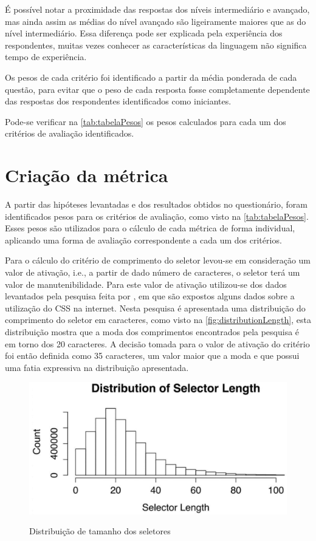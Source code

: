 É possível notar a proximidade das respostas dos níveis intermediário e avançado, mas ainda assim as médias do nível avançado são ligeiramente maiores que as do nível intermediário. Essa diferença pode ser explicada pela experiência dos respondentes, muitas vezes conhecer as características da linguagem não significa tempo de experiência.

Os pesos de cada critério foi identificado a partir da média ponderada de cada questão, para evitar que o peso de cada resposta fosse completamente dependente das respostas dos respondentes identificados como iniciantes.

Pode-se verificar na \autoref{tab:tabelaPesos} os pesos calculados para cada um dos critérios de avaliação identificados.



\section{Criação da métrica}
	
A partir das hipóteses levantadas e dos resultados obtidos no questionário, foram identificados pesos para os critérios de avaliação, como visto na \autoref{tab:tabelaPesos}. Esses pesos são utilizados para o cálculo de cada métrica de forma individual, aplicando uma forma de avaliação correspondente a cada um dos critérios.

Para o cálculo do critério de comprimento do seletor levou-se em consideração um valor de ativação, i.e., a partir de dado número de caracteres, o seletor terá um valor de manutenibilidade. Para este valor de ativação utilizou-se dos dados levantados pela pesquisa feita por , em que são expostos alguns dados sobre a utilização do CSS na internet. Nesta pesquisa é apresentada uma distribuição do comprimento do seletor em caracteres, como visto na \autoref{fig:distributionLength}, esta distribuição mostra que a moda dos comprimentos encontrados pela pesquisa é em torno dos 20 caracteres. A decisão tomada para o valor de ativação do critério foi então definida como 35 caracteres, um valor maior que a moda e que possui uma fatia expressiva na distribuição apresentada.

\begin{figure}[!htb]
	\centering
	\caption{Distribuição de tamanho dos seletores}
	\includegraphics[width=1\textwidth]{./04-figuras/dist_selectorL}
	\label{fig:distributionLength}
\end{figure}

